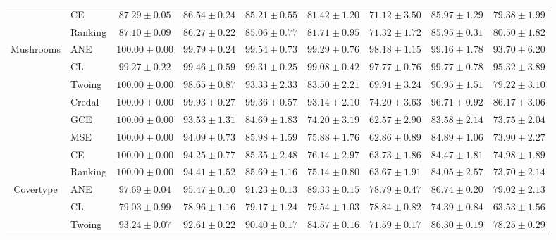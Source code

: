 \documentclass[letterpaper]{article} %
\begin{document}
\begin{table}[t]
\begin{tabular}{clccccccc}
 & CE     & $\mathbf{87.29 \pm 0.05}$ & $86.54 \pm 0.24$ & $85.21 \pm 0.55$ & $81.42 \pm 1.20$ & $71.12 \pm 3.50$ & $85.97 \pm 1.29$ & $79.38 \pm 1.99$ \\ 
 & Ranking & $87.10 \pm 0.09$ & $86.27 \pm 0.22$ & $85.06 \pm 0.77$ & $81.71 \pm 0.95$ & $71.32 \pm 1.72$ & $85.95 \pm 0.31$ & $80.50 \pm 1.82$ \\ 
\hline
\multirow{8}{*}{Mushrooms}
 & ANE    & $\mathbf{100.00 \pm 0.00}$ & $\mathbf{99.79 \pm 0.24}$ & $\mathbf{99.54 \pm 0.73}$ & $\mathbf{99.29 \pm 0.76}$ & $\mathbf{98.18 \pm 1.15}$ & $\mathbf{99.16 \pm 1.78}$ & $\mathbf{93.70 \pm 6.20}$ \\ 
 & CL     & $99.27 \pm 0.22$ & $\mathbf{99.46 \pm 0.59}$ & $\mathbf{99.31 \pm 0.25}$ & $\mathbf{99.08 \pm 0.42}$ & $\mathbf{97.77 \pm 0.76}$ & $\mathbf{99.77 \pm 0.78}$ & $\mathbf{95.32 \pm 3.89}$ \\ 
 & Twoing & $\mathbf{100.00 \pm 0.00}$ & $98.65 \pm 0.87$ & $93.33 \pm 2.33$ & $83.50 \pm 2.21$ & $69.91 \pm 3.24$ & $90.95 \pm 1.51$ & $79.22 \pm 3.10$ \\ 
 & Credal & $\mathbf{100.00 \pm 0.00}$ & $\mathbf{99.93 \pm 0.27}$ & $\mathbf{99.36 \pm 0.57}$ & $93.14 \pm 2.10$ & $74.20 \pm 3.63$ & $96.71 \pm 0.92$ & $86.17 \pm 3.06$ \\ 
 & GCE    & $\mathbf{100.00 \pm 0.00}$ & $93.53 \pm 1.31$ & $84.69 \pm 1.83$ & $74.20 \pm 3.19$ & $62.57 \pm 2.90$ & $83.58 \pm 2.14$ & $73.75 \pm 2.04$ \\ 
 & MSE    & $\mathbf{100.00 \pm 0.00}$ & $94.09 \pm 0.73$ & $85.98 \pm 1.59$ & $75.88 \pm 1.76$ & $62.86 \pm 0.89$ & $84.89 \pm 1.06$ & $73.90 \pm 2.27$ \\ 
 & CE     & $\mathbf{100.00 \pm 0.00}$ & $94.25 \pm 0.77$ & $85.35 \pm 2.48$ & $76.14 \pm 2.97$ & $63.73 \pm 1.86$ & $84.47 \pm 1.81$ & $74.98 \pm 1.89$ \\ 
 & Ranking & $\mathbf{100.00 \pm 0.00}$ & $94.41 \pm 1.52$ & $85.69 \pm 1.16$ & $75.14 \pm 0.80$ & $63.67 \pm 1.91$ & $84.05 \pm 2.57$ & $73.70 \pm 2.14$ \\ 
\hline
\multirow{8}{*}{Covertype}
 & ANE    & $97.69 \pm 0.04$ & $95.47 \pm 0.10$ & $91.23 \pm 0.13$ & $\mathbf{89.33 \pm 0.15}$ & $\mathbf{78.79 \pm 0.47}$ & $86.74 \pm 0.20$ & $\mathbf{79.02 \pm 2.13}$ \\ 
 & CL     & $79.03 \pm 0.99$ & $78.96 \pm 1.16$ & $79.17 \pm 1.24$ & $79.54 \pm 1.03$ & $\mathbf{78.84 \pm 0.82}$ & $74.39 \pm 0.84$ & $63.53 \pm 1.56$ \\ 
 & Twoing & $93.24 \pm 0.07$ & $92.61 \pm 0.22$ & $90.40 \pm 0.17$ & $84.57 \pm 0.16$ & $71.59 \pm 0.17$ & $86.30 \pm 0.19$ & $\mathbf{78.25 \pm 0.29}$ \\ 

\end{tabular}
\end{table}
\end{document}
